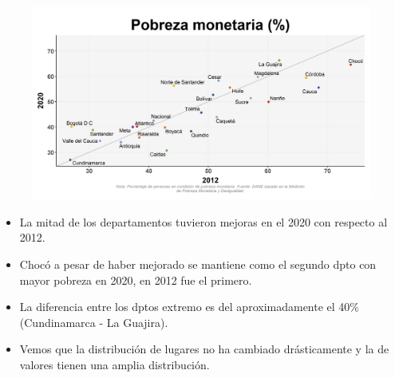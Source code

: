    \begin{figure}[H]
        \caption[Pobreza monetaria por departamentos - 2012 VS 2020 ]{\label{pobreza_monetaria_dptos_vs} }
        \begin{center}
        \includegraphics[width=\textwidth,keepaspectratio]{img/var_262_scatter_time.png}
        \end{center}
    \end{figure}
            \begin{itemize}
                    \item La mitad de los departamentos tuvieron mejoras en el 2020 con respecto al 2012.
                    \item Chocó a pesar de haber mejorado se mantiene como el segundo dpto con mayor pobreza en 2020, en 2012 fue el primero.
                    \item La diferencia entre los dptos extremo es del aproximadamente el 40\% (Cundinamarca - La Guajira).
                    \item Vemos que la distribución de lugares no ha cambiado drásticamente y la de valores tienen una amplia distribución.
                    \end{itemize}

